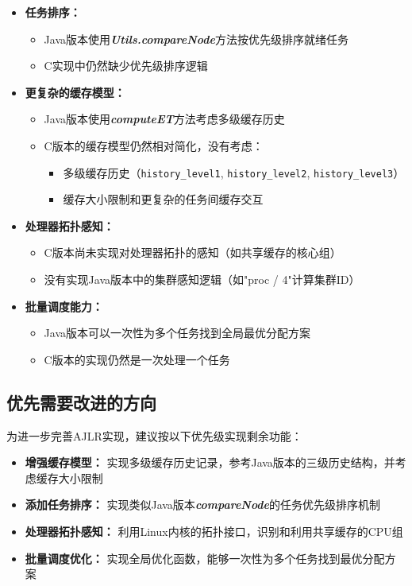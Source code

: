 \documentclass[a4paper,12pt]{article}
\begin{document}
\begin{itemize}
  \item \textbf{任务排序：}
   \begin{itemize}
     \item Java版本使用\textit{\textbf{Utils.compareNode}}方法按优先级排序就绪任务
     \item C实现中仍然缺少优先级排序逻辑
   \end{itemize}

  \item \textbf{更复杂的缓存模型：}
   \begin{itemize}
     \item Java版本使用\textit{\textbf{computeET}}方法考虑多级缓存历史
     \item C版本的缓存模型仍然相对简化，没有考虑：
       \begin{itemize}
         \item 多级缓存历史（\texttt{history\_level1}, \texttt{history\_level2}, \texttt{history\_level3}）
         \item 缓存大小限制和更复杂的任务间缓存交互
       \end{itemize}
   \end{itemize}

  \item \textbf{处理器拓扑感知：}
   \begin{itemize}
     \item C版本尚未实现对处理器拓扑的感知（如共享缓存的核心组）
     \item 没有实现Java版本中的集群感知逻辑（如"proc / 4"计算集群ID）
   \end{itemize}

  \item \textbf{批量调度能力：}
   \begin{itemize}
     \item Java版本可以一次性为多个任务找到全局最优分配方案
     \item C版本的实现仍然是一次处理一个任务
   \end{itemize}
\end{itemize}

\subsection{优先需要改进的方向}

为进一步完善AJLR实现，建议按以下优先级实现剩余功能：

\begin{itemize}
  \item \textbf{增强缓存模型：} 实现多级缓存历史记录，参考Java版本的三级历史结构，并考虑缓存大小限制
  
  \item \textbf{添加任务排序：} 实现类似Java版本\textit{\textbf{compareNode}}的任务优先级排序机制
  
  \item \textbf{处理器拓扑感知：} 利用Linux内核的拓扑接口，识别和利用共享缓存的CPU组
  
  \item \textbf{批量调度优化：} 实现全局优化函数，能够一次性为多个任务找到最优分配方案
\end{itemize}
\end{document}
